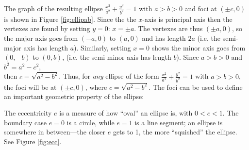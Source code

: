The graph of the resulting ellipse $\frac{x^2}{a^2} + \frac{y^2}{b^2} = 1$ with
$a>b>0$ and foci at $(\pm c,0)$ is shown in Figure \ref{fig:ellipab}. Since the
the $x$-axis is principal axis then the vertexes are found by setting $y=0$:
$x=\pm a$. The vertexes are thus $(\pm a,0)$, so the major axis goes from
$(-a,0)$ to $(a,0)$ and has length $2a$ (i.e. the semi-major axis has length
$a$). Similarly, setting $x=0$ shows the minor axis goes from $(0,-b)$ to
$(0,b)$, (i.e. the semi-minor axis has length $b$). Since $a>b>0$ and
$b^2 = a^2 - c^2$,\\then $c = \sqrt{a^2 - b^2}$. Thus, for \emph{any} ellipse of
the form $\frac{x^2}{a^2} + \frac{y^2}{b^2} = 1$ with $a>b>0$, the foci will be
at $(\pm c,0)$, where $c = \sqrt{a^2 - b^2}$. The foci can be used to
define an important geometric property of the ellipse:


The eccentricity $e$ is a measure of how ``oval'' an ellipse is, with $0<e<1$.
The boundary case $e=0$ is a circle, while $e=1$ is a line segment; an ellipse
is somewhere in between---the closer $e$ gets to 1, the more ``squished'' the
ellipse. See Figure \ref{fig:ecc}.

